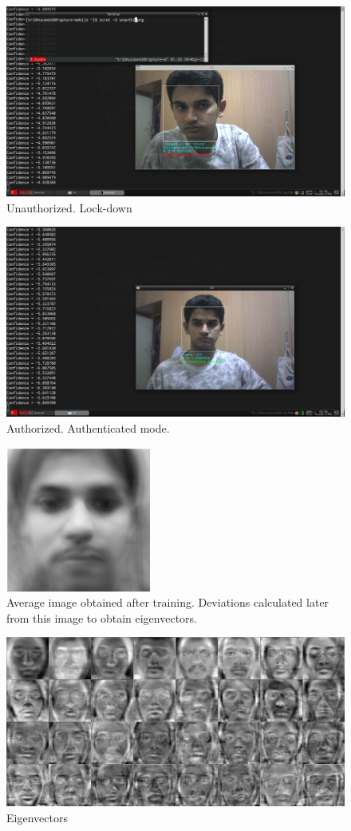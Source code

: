 \documentclass[12pt]{article}			%
\begin{document}
\begin{figure}
	\caption{Unauthorized. Lock-down}
	\centering
\includegraphics[scale=0.3]{img/unauth2.png}
\end{figure}

\begin{figure}
	\caption{Authorized. Authenticated mode.}
	\centering
\includegraphics[scale=0.3]{img/hard2.png}
\end{figure}

\begin{figure}
	\caption{Average image obtained after training. Deviations calculated later from this image to obtain eigenvectors.}
	\centering
\includegraphics[scale=1]{img/avg_image.jpeg}
\end{figure}

\begin{figure}
	\caption{Eigenvectors}
	\centering
\includegraphics[scale=0.2]{img/eigen.png}
\end{figure}
  
\end{document}
